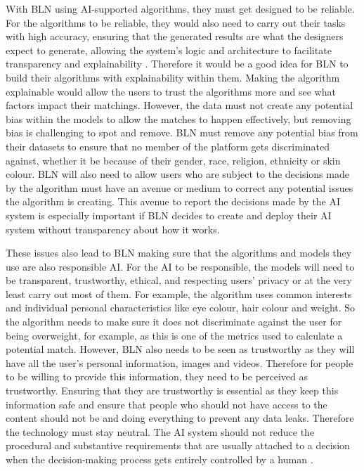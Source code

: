 \documentclass[a4paper,10pt]{article}
\begin{document}
	With BLN using AI-supported algorithms, they must get designed to be reliable. For the algorithms to be reliable, they would also need to carry out their tasks with high accuracy, ensuring that the generated results are what the designers expect to generate, allowing the system's logic and architecture to facilitate transparency and explainability \cite{adam_slides_regulating_ai}. Therefore it would be a good idea for BLN to build their algorithms with explainability within them. Making the algorithm explainable would allow the users to trust the algorithms more and see what factors impact their matchings. However, the data must not create any potential bias within the models to allow the matches to happen effectively, but removing bias is challenging to spot and remove. BLN must remove any potential bias from their datasets to ensure that no member of the platform gets discriminated against, whether it be because of their gender, race, religion, ethnicity or skin colour. BLN will also need to allow users who are subject to the decisions made by the algorithm must have an avenue or medium to correct any potential issues the algorithm is creating. This avenue to report the decisions made by the AI system is especially important if BLN decides to create and deploy their AI system without transparency about how it works. 

	These issues also lead to BLN making sure that the algorithms and models they use are also responsible AI. For the AI to be responsible, the models will need to be transparent, trustworthy, ethical, and respecting users' privacy \cite{berte_slides_ai_law_overview} or at the very least carry out most of them. For example, the algorithm uses common interests and individual personal characteristics like eye colour, hair colour and weight. So the algorithm needs to make sure it does not discriminate against the user for being overweight, for example, as this is one of the metrics used to calculate a potential match. However, BLN also needs to be seen as trustworthy as they will have all the user's personal information, images and videos. Therefore for people to be willing to provide this information, they need to be perceived as trustworthy. Ensuring that they are trustworthy is essential as they keep this information safe and ensure that people who should not have access to the content should not be and doing everything to prevent any data leaks. Therefore the technology must stay neutral. The AI system should not reduce the procedural and substantive requirements that are usually attached to a decision when the decision-making process gets entirely controlled by a human \cite{adam_slides_regulating_ai}.
\end{document}
